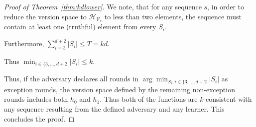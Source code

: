 \documentclass[11pt,letterpaper]{article}
\theoremstyle{definition}
\theoremstyle{plain}
\begin{document}
\begin{proof}[Proof of Theorem~\ref{thm:kdlower}]
We note, that for any sequence $s$, in order to reduce the version space to $\mathcal{H}_{\mathcal{V}_s}$ to less than two elements, the sequence must contain at least one (truthful) element from every $S_i$.

Furthermore, $\sum_{i=3}^{d+2} |S_i| \leq T = k d$.

Thus $\min_{i \in \{3, \dots, d+2}|S_i| \leq k$.

Thus, if the adversary declares all rounds in $ \arg\min_{S_i: i \in \{3, \dots, d+2}|S_i| $ as exception rounds, the version space defined by the remaining non-exception rounds includes both $h_0$ and $h_1$.
Thus both of the functions are $k$-consistent with any sequence resulting from the defined adversary and any learner. This concludes the proof.



 
\end{proof}



\fi
\end{document}

